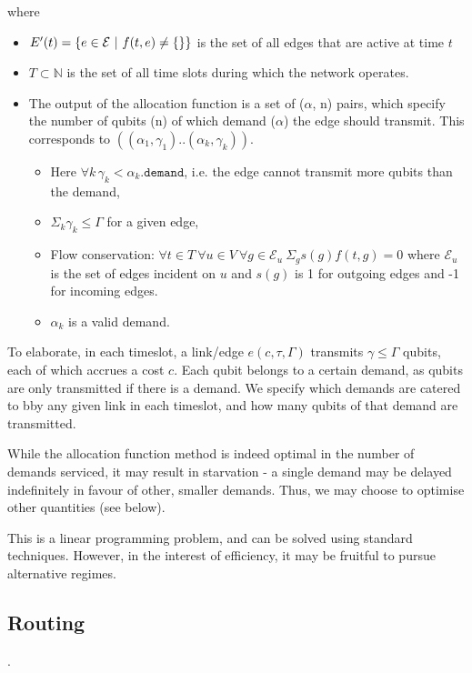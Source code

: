 \documentclass{amsart}
\begin{document}
    where \begin{itemize}
        \item \(E'(t) = \left\{e \in \mathcal{E} \ |\  f(t, e) \neq \{\} \right\}\) is the set of all edges that are active at time \(t\)
        \item \(T \subset \mathbb{N}\) is the set of all time slots during which the network operates.
        \item The output of the allocation function is a set of (\(\alpha\), n) pairs, which specify the number of qubits (n) of which demand (\(\alpha\)) the edge should transmit. This corresponds to \(((\alpha_1, \gamma_1)..(\alpha_k, \gamma_k))\).
         \begin{itemize}
            \item  Here \(\forall k\, \gamma_k < \alpha_k\texttt{.demand}\), i.e. the edge cannot transmit more qubits than the demand,
            \item \(\Sigma_k \gamma_k \leq \Gamma\) for a given edge, 
            \item Flow conservation: \(\forall t \in T\ \forall u \in V\ \forall g \in \mathcal{E}_u\  \Sigma_g s(g)f(t, g) = 0\) where \(\mathcal{E}_u\) is the set of edges incident on \(u\) and \(s(g)\) is 1 for outgoing edges and -1 for incoming edges.
            \item \(\alpha_k\) is a valid demand.
        \end{itemize}
    \end{itemize}

    To elaborate, in each timeslot, a link/edge \(e(c, \tau ,\Gamma)\) transmits \(\gamma \leq \Gamma\) qubits, each of which accrues a cost \(c\). Each qubit belongs to a certain demand, as qubits are only transmitted if there is a demand. We specify which demands are catered to bby any given link in each timeslot, and how many qubits of that demand are transmitted.

    While the allocation function method is indeed optimal in the number of demands serviced, it may result in starvation - a single demand may be delayed indefinitely in favour of other, smaller demands. Thus, we may choose to optimise other quantities (see below).

    This is a linear programming problem, and can be solved using standard techniques. However, in the interest of efficiency, it may be fruitful to pursue alternative regimes.

    \subsection{Routing}.
\end{document}
